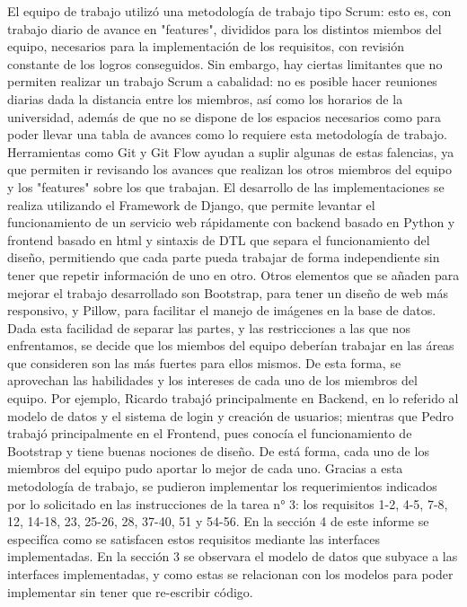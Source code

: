 El equipo de trabajo utilizó una metodología de trabajo tipo Scrum: esto es, con trabajo diario de avance en "features", divididos para los distintos miembos del equipo, necesarios para la implementación de los requisitos, con revisión constante de los logros conseguidos.
Sin embargo, hay ciertas limitantes que no permiten realizar un trabajo Scrum a cabalidad: no es posible hacer reuniones diarias dada la distancia entre los miembros, así como los horarios de la universidad, además de que no se dispone de los espacios necesarios como para poder llevar una tabla de avances como lo requiere esta metodología de trabajo. Herramientas como Git y Git Flow ayudan a suplir algunas de estas falencias, ya que permiten ir revisando los avances que realizan los otros miembros del equipo y los "features" sobre los que trabajan.
El desarrollo de las implementaciones se realiza utilizando el Framework de Django, que permite levantar el funcionamiento de un servicio web rápidamente con backend basado en Python y frontend basado en html y sintaxis de DTL que separa el funcionamiento del diseño, permitiendo que cada parte pueda trabajar de forma independiente sin tener que repetir información de uno en otro. Otros elementos que se añaden para mejorar el trabajo desarrollado son Bootstrap, para tener un diseño de web más responsivo, y Pillow, para facilitar el manejo de imágenes en la base de datos.
Dada esta facilidad de separar las partes, y las restricciones a las que nos enfrentamos, se decide que los miembos del equipo deberían trabajar en las áreas que consideren son las más fuertes para ellos mismos. De esta forma, se aprovechan las habilidades y los intereses de cada uno de los miembros del equipo. Por ejemplo, Ricardo trabajó principalmente en Backend, en lo referido al modelo de datos y el sistema de login y creación de usuarios; mientras que Pedro trabajó principalmente en el Frontend, pues conocía el funcionamiento de Bootstrap y tiene buenas nociones de diseño. De está forma, cada uno de los miembros del equipo pudo aportar lo mejor de cada uno.
Gracias a esta metodología de trabajo, se pudieron implementar los requerimientos indicados por lo solicitado en las instrucciones de la tarea n° 3: los requisitos 1-2, 4-5, 7-8, 12, 14-18, 23, 25-26, 28, 37-40, 51 y 54-56. En la sección 4 de este informe se especifíca como se satisfacen estos requisitos mediante las interfaces implementadas. En la sección 3 se observara el modelo de datos que subyace a las interfaces implementadas, y como estas se relacionan con los modelos para poder implementar sin tener que re-escribir código. 